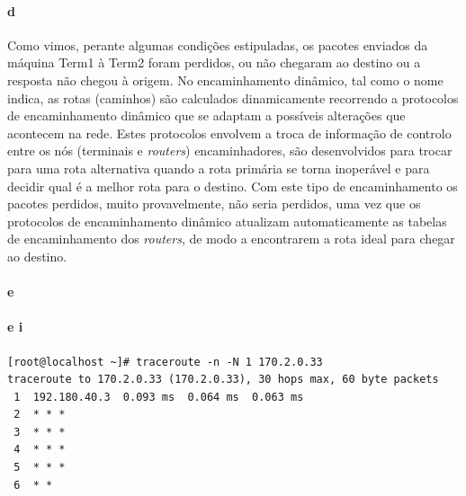 \paragraph{d}
Como vimos, perante algumas condições estipuladas, os pacotes enviados da máquina \textsf{Term1} à \textsf{Term2} foram perdidos, ou não chegaram ao destino ou a resposta não chegou à origem.
No encaminhamento dinâmico, tal como o nome indica, as rotas (caminhos) são calculados dinamicamente recorrendo a protocolos de encaminhamento dinâmico que se adaptam a possíveis alterações que acontecem na rede. Estes protocolos envolvem a troca de informação de controlo entre os nós (terminais e \emph{routers}) encaminhadores, são desenvolvidos para trocar para uma rota alternativa quando a rota primária se torna inoperável e para decidir qual é a melhor rota para o destino.
Com este tipo de encaminhamento os pacotes perdidos, muito provavelmente, não seria perdidos, uma vez que os protocolos de encaminhamento dinâmico atualizam automaticamente as tabelas de encaminhamento dos \emph{routers}, de modo a encontrarem a rota ideal para chegar ao destino.

\paragraph{e}

\paragraph{e i}
\begin{verbatim}
[root@localhost ~]# traceroute -n -N 1 170.2.0.33
traceroute to 170.2.0.33 (170.2.0.33), 30 hops max, 60 byte packets
 1  192.180.40.3  0.093 ms  0.064 ms  0.063 ms                                                             
 2  * * *                                                                
 3  * * *                                                                
 4  * * *                                                                
 5  * * *                                                                
 6  * *
\end{verbatim}
